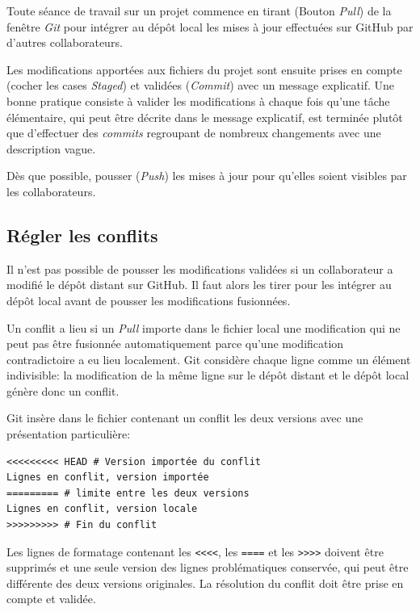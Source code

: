 \documentclass[
  11pt,
  french,
  a4paper,
  extrafontsizes,onecolumn,openright
  ]{memoir}
\begin{document}
Toute séance de travail sur un projet commence en tirant (Bouton \emph{Pull}) de la fenêtre \emph{Git} pour intégrer au dépôt local les mises à jour effectuées sur GitHub par d'autres collaborateurs.

Les modifications apportées aux fichiers du projet sont ensuite prises en compte (cocher les cases \emph{Staged}) et validées (\emph{Commit}) avec un message explicatif.
Une bonne pratique consiste à valider les modifications à chaque fois qu'une tâche élémentaire, qui peut être décrite dans le message explicatif, est terminée plutôt que d'effectuer des \emph{commits} regroupant de nombreux changements avec une description vague.

Dès que possible, pousser (\emph{Push}) les mises à jour pour qu'elles soient visibles par les collaborateurs.

\hypertarget{ruxe9gler-les-conflits}{%
\subsection{Régler les conflits}\label{ruxe9gler-les-conflits}}

Il n'est pas possible de pousser les modifications validées si un collaborateur a modifié le dépôt distant sur GitHub.
Il faut alors les tirer pour les intégrer au dépôt local avant de pousser les modifications fusionnées.

Un conflit a lieu si un \emph{Pull} importe dans le fichier local une modification qui ne peut pas être fusionnée automatiquement parce qu'une modification contradictoire a eu lieu localement.
Git considère chaque ligne comme un élément indivisible: la modification de la même ligne sur le dépôt distant et le dépôt local génère donc un conflit.

Git insère dans le fichier contenant un conflit les deux versions avec une présentation particulière:

\begin{verbatim}
<<<<<<<<< HEAD # Version importée du conflit
Lignes en conflit, version importée
========= # limite entre les deux versions
Lignes en conflit, version locale
>>>>>>>>> # Fin du conflit
\end{verbatim}

Les lignes de formatage contenant les \texttt{\textless{}\textless{}\textless{}\textless{}}, les \texttt{====} et les \texttt{\textgreater{}\textgreater{}\textgreater{}\textgreater{}} doivent être supprimés et une seule version des lignes problématiques conservée, qui peut être différente des deux versions originales.
La résolution du conflit doit être prise en compte et validée.
\end{document}
